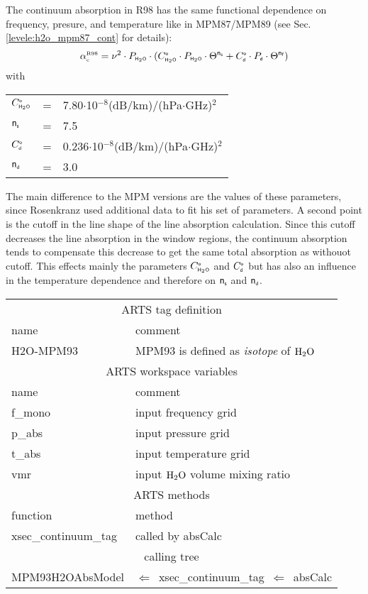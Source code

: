 The continuum absorption in R98 has the same functional dependence on frequency,
presure, and temperature like in MPM87/MPM89 (see Sec. \ref{levele:h2o_mpm87_cont}
for details):
\begin{equation} 
  \label{eq:r98:cont}
  \alpha^{\mbox{\tiny \rm R98}}_{\mbox{\tiny c}} = \nu^2 \cdot P_{\mbox{\tiny \sf H}_{2}\mbox{\tiny \sf O}} \cdot 
               (C^{\mbox{\tiny \sf o}}_{\mbox{\tiny \sf H}_{2}\mbox{\tiny \sf O}} \cdot P_{\mbox{\tiny \sf H}_{2}\mbox{\tiny \sf O}} \cdot \Theta^{{\sf n}_{\mbox{\tiny \sf s}}} + 
                C^{\mbox{\tiny \sf o}}_{\mbox{\tiny \sf d}} \cdot P_{\mbox{\tiny \sf d}}  \cdot \Theta^{{\sf n}_{\mbox{\tiny \sf f}}})
\end{equation}
with\\
\begin{tabular}{lcl}
$C^{\mbox{\tiny \sf o}}_{\mbox{\tiny \sf H}_{2}\mbox{\tiny \sf O}}$   & = & 7.80$\cdot$10$^{-8}$(dB/km)/(hPa$\cdot$GHz)$^2$\\
${\sf n}_{\mbox{\tiny \sf s}}$    & = & 7.5\\
$C^{\mbox{\tiny \sf o}}_{\mbox{\tiny \sf d}}$   & = & 0.236$\cdot$10$^{-8}$(dB/km)/(hPa$\cdot$GHz)$^2$\\
${\sf n}_{\mbox{\tiny \sf d}}$    & = & 3.0\\
\end{tabular}
The main difference to the MPM versions are the values of these 
parameters, since Rosenkranz used additional data to fit his set of 
parameters. A second point is the cutoff in the line shape of the line 
absorption calculation. Since this cutoff decreases the line absorption 
in the window regions, the continuum absorption tends to compensate this 
decrease to get the same total absorption as withouot cutoff. This effects 
mainly the parameters $C^{\mbox{\tiny \sf o}}_{\mbox{\tiny \sf H}_{2}\mbox{\tiny \sf O}}$ and $C^{\mbox{\tiny \sf o}}_{\mbox{\tiny \sf d}}$ but has also an influence in the 
temperature dependence and therefore on ${\sf n}_{\mbox{\tiny \sf s}}$ and ${\sf n}_{\mbox{\tiny \sf d}}$.
%
%
\begin{center}
\begin{tabular}{ll}
\hline
\multicolumn{2}{c}{ARTS tag definition}\\
name      & comment \\
H2O-MPM93 & MPM93 is defined as {\it isotope} of $\mbox{H}_2\mbox{O}$\\
\hline
\multicolumn{2}{c}{ARTS workspace variables}\\
name & comment \\
 f\_mono & input frequency grid \\
 p\_abs  & input pressure grid \\
 t\_abs  & input temperature grid\\
 vmr    & input $\mbox{H}_2\mbox{O}$ volume mixing ratio\\
\hline
\multicolumn{2}{c}{ARTS methods}\\
function           & method\\
xsec\_continuum\_tag & called by absCalc \\
\hline
\multicolumn{2}{c}{calling tree}\\
MPM93H2OAbsModel & $\Leftarrow$~xsec\_continuum\_tag~$\Leftarrow$~absCalc\\
\end{tabular}
\end{center}

